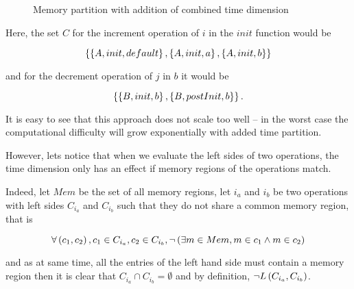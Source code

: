 \documentclass[..thesis.tex]{subfiles}
\begin{document}
\begin{figure}[H]
    \caption{Memory partition with addition of combined time dimension}
\end{figure}

Here, the set $C$ for the increment operation of $i$ in the $init$ function would be

\begin{equation*}
\left\lbrace \left\lbrace A, init, default \right\rbrace, \left\lbrace A, init, a \right\rbrace, \left\lbrace A, init, b \right\rbrace \right\rbrace
\end{equation*}

and for the decrement operation of $j$ in $b$ it would be

\begin{equation*}
\left\lbrace \left\lbrace B, init, b \right\rbrace, \left\lbrace B, postInit, b \right\rbrace \right\rbrace \text{.}
\end{equation*}


It is easy to see that this approach does not scale too well -- in the worst case the computational difficulty will grow exponentially with added time partition.


However, lets notice that when we evaluate the left sides of two operations, the time dimension only has an effect if memory regions of the operations match. 

Indeed, let $Mem$ be the set of all memory regions, let $i_{a}$ and $i_{b}$ be two operations with left sides $C_{i_{a}}$ and $C_{i_{b}}$ such that they do not share a common memory region, that is

\begin{equation*}
\forall \left( c_1, c_2 \right), c_1 \in C_{i_a} , c_2 \in C_{i_b} , \lnot \left( \exists m \in Mem,  m \in c_1 \land m \in c_2 \right)
\end{equation*} 


and as at same time, all the entries of the left hand side must contain a memory region then it is clear that $C_{i_{a}} \cap C_{i_{b}} = \emptyset$ and by definition,  $\lnot L \left( C_{i_{a}}, C_{i_{b}} \right) $. 
\end{document}
